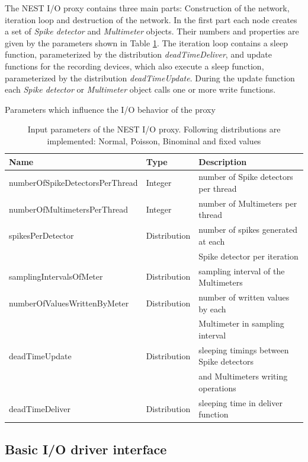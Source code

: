 \documentclass[]{YIC2015}
\begin{document}
The NEST I/O proxy contains three main parts: Construction of the
network, iteration loop and destruction of the network. In the first
part each node creates a set of \emph{Spike detector} and
\emph{Multimeter} objects. Their numbers and properties are given by
the parameters shown in Table \ref{tab:table-silva1}. The iteration
loop contains a sleep function, parameterized by the distribution
\emph{deadTimeDeliver}, and update functions for the recording
devices, which also execute a sleep function, parameterized by the
distribution \emph{deadTimeUpdate}. During the update function each
\emph{Spike detector} or \emph{Multimeter} object calls one or more
write functions.

\begin{table}[htdp]
\caption{Parameters which influence the I/O behavior of the proxy}
\centering
\begin{tabular}{lll}
\hline\hline
\textbf{Name}                   & \textbf{Type} & \textbf{Description} \\ \hline
numberOfSpikeDetectorsPerThread & Integer       & number of Spike detectors per thread  \\
numberOfMultimetersPerThread    & Integer       & number of Multimeters per thread  \\
spikesPerDetector               & Distribution  & number of spikes generated at each \\
				& 	        & Spike detector per iteration  \\
samplingIntervalsOfMeter        & Distribution  & sampling interval of the Multimeters  \\
numberOfValuesWrittenByMeter    & Distribution  & number of written values by each \\
				& 	        & Multimeter in sampling interval  \\
deadTimeUpdate                  & Distribution  & sleeping timings between Spike detectors \\
				& 	        & and Multimeters writing operations \\
deadTimeDeliver                 & Distribution  & sleeping time in deliver function  \\
\hline\hline
\end{tabular}
\label{tab:table-silva1}
\caption{Input parameters of the NEST I/O proxy. Following distributions
  are implemented: Normal, Poisson, Binominal and fixed values}
\end{table}

\subsection{Basic I/O driver interface}
\end{document}
